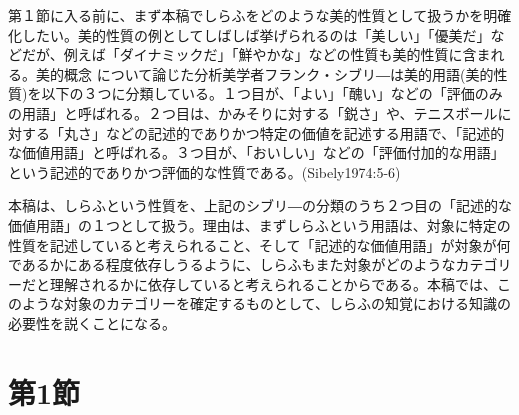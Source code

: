 \documentclass[b5j,twoside,twocolumn]{utarticle}
\begin{document}
第１節に入る前に、まず本稿でしらふをどのような美的性質として扱うかを明確化したい。美的性質の例としてしばしば挙げられるのは「美しい」「優美だ」などだが、例えば「ダイナミックだ」「鮮やかな」などの性質も美的性質に含まれる。美的概念 について論じた分析美学者フランク・シブリ―は美的用語(美的性質)を以下の３つに分類している。１つ目が、「よい」「醜い」などの「評価のみの用語」と呼ばれる。２つ目は、かみそりに対する「鋭さ」や、テニスボールに対する「丸さ」などの記述的でありかつ特定の価値を記述する用語で、「記述的な価値用語」と呼ばれる。３つ目が、「おいしい」などの「評価付加的な用語」という記述的でありかつ評価的な性質である。(Sibely1974:5-6)

本稿は、しらふという性質を、上記のシブリ―の分類のうち２つ目の「記述的な価値用語」の１つとして扱う。理由は、まずしらふという用語は、対象に特定の性質を記述していると考えられること、そして「記述的な価値用語」が対象が何であるかにある程度依存しうるように、しらふもまた対象がどのようなカテゴリーだと理解されるかに依存していると考えられることからである。本稿では、このような対象のカテゴリーを確定するものとして、しらふの知覚における知識の必要性を説くことになる。


\section{第1節}
\end{document}
